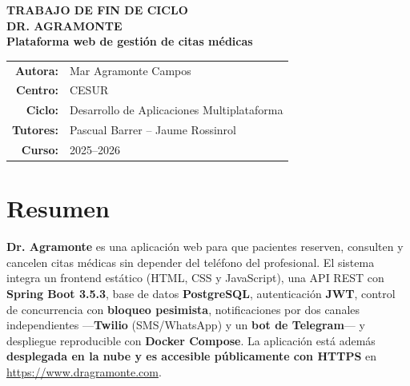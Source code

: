 \documentclass[12pt,a4paper]{report}
\begin{document}
\begin{titlepage}
  \pagestyle{empty}
  \centering
  \vspace*{1.5cm}
  {\Large\bfseries\color{tealdark} TRABAJO DE FIN DE CICLO\\[0.8em]}
  \vspace{0.8cm}
  {\Huge\bfseries\color{teal} DR. AGRAMONTE\\[0.4em]}
  {\Large\bfseries\color{teallight} Plataforma web de gestión de citas médicas\\[1.5em]}
  \vfill
  \begin{tabular}{rl}
    \textbf{Autora:} & Mar Agramonte Campos \\
    \textbf{Centro:} & CESUR \\
    \textbf{Ciclo:} & Desarrollo de Aplicaciones Multiplataforma \\
    \textbf{Tutores:} & Pascual Barrer -- Jaume Rossinrol \\
    \textbf{Curso:} & 2025--2026 \\
  \end{tabular}
\end{titlepage}

\clearpage
\pagestyle{fancy}
\setcounter{page}{1}

\chapter*{Resumen}

\textbf{Dr. Agramonte} es una aplicación web para que pacientes reserven, consulten y cancelen citas médicas sin depender del teléfono del profesional. El sistema integra un frontend estático (HTML, CSS y JavaScript), una API REST con \textbf{Spring Boot 3.5.3}, base de datos \textbf{PostgreSQL}, autenticación \textbf{JWT}, control de concurrencia con \textbf{bloqueo pesimista}, notificaciones por dos canales independientes —\textbf{Twilio} (SMS/WhatsApp) y un \textbf{bot de Telegram}— y despliegue reproducible con \textbf{Docker Compose}. La aplicación está además \textbf{desplegada en la nube y es accesible públicamente con HTTPS} en \url{https://www.dragramonte.com}.
\end{document}
